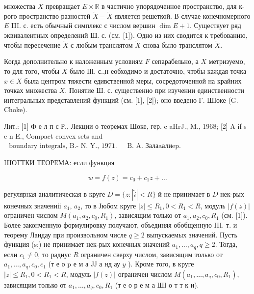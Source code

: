 \documentclass[10pt]{article}
\begin{document}
множества $X$ превращает $E \times \mathbb{R}$ в частично упорядоченное пространство, для к-рого пространство разностей $\tilde{X}-\tilde{X}$ является решеткой. В случае конечномерного $E$ III. с. есть обычный симплекс с числом вершин $\operatorname{dim} E+1$. Существует ряд эквивалентных определений Ш. с. (см. [1]). Одно из них сводится к требованию, чтобы пересечение $\tilde{X}$ с любым транслятом $\tilde{X}$ снова было транслятом $\tilde{X}$.



Когда дополнительно к наложенным условиям $F$ сепарабельно, а $X$ метризуемо, то для того, чтобы $X$ было ІІІ. с.,н еобходимо и достаточно, чтобы каждая точка $x \in X$ была центром тяжести едивственной меры, сосредоточенной на крайних точках множества $X$. Понятие Ш. с. существенно при изучении единственности интегральных представлений функций (см. [1], [2|); оно введено Г. ШІоке (G. Choke).



Лит.: [1] Ф е л п с Р., Лекции о теоремах Шоке, гер. c aHrJ., M., 1968; [2] A if s e n E., Compact convex sets and $\begin{array}{ll}\text { boundary integrals, B.- N. Y., 1971. } & \text { B. A. Залаaалиep. }\end{array}$



IIIОТТКИ ТЕОРЕМА: если функция



\[

w=f(z)=c_{0}+c_{1} z+\ldots

\]



регулярная аналитическая в круге $D=\{z:|\tilde{i}|<R\}$ й не принимает в $D$ нек-рых конечных значениіі $a_{1}$, $a_{2}$, то в Јюбом круге $|z| \leqslant R_{1}, 0<R_{1}<R$, модуль $|f(z)|$ ограничен числом $M\left(a_{1}, a_{2}, c_{0}, R_{1}\right)$, зависящим только от $a_{1}, a_{2}, c_{0}, R_{1}$ (см. [1]). Более законченную формулировку получают, объединяя обобщенную III. т. и теорему Ландау при произвольном числе $q \geqslant 2$ выпускаемых значений. Пусть функция (s:) не принимает нек-рых конечных значений $a_{1}, \ldots, a_{q}, q \geqslant 2$. Тогда, если $c_{1} \neq 0$, то радиус $R$ ограничен сверху числом, зависящим только от $a_{1}, \ldots, a_{q}, c_{0}, c_{1}$ (т е о $\mathrm{p}$ е м а JЈ а нд ау $y$ ). Кроме того, в круге $|z| \leqslant R_{1}, 0<R_{1}<R$, модуль $|f(z)|$ ограничен числом $M\left(a_{1}, \ldots, a_{q}, c_{0}, R_{1}\right)$, зависящим только от $a_{1}, \ldots, a_{q}, c_{0}, R_{1}$ (т е о р е м а ШІ о т т к и).
\end{document}
